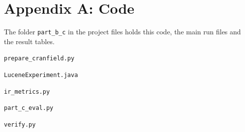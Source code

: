 \clearpage\appendix\section*{Appendix A: Code}
The folder \texttt{part\_b\_c} in the project files holds this code, the main run files and the result tables.

\texttt{prepare\_cranfield.py}

\texttt{LuceneExperiment.java}

\texttt{ir\_metrics.py}

\texttt{part\_c\_eval.py}

\texttt{verify.py}


